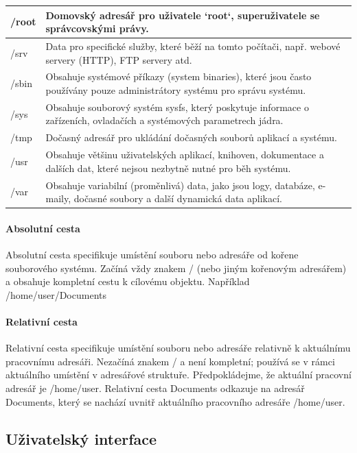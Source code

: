 \begin{center}
\begin{tabular}{|l|p{10cm}|}
 \hline
 /root    & Domovský adresář pro uživatele `root`, superuživatele se správcovskými právy. \\
 \hline
 /srv     & Data pro specifické služby, které běží na tomto počítači, např. webové servery (HTTP), FTP servery atd. \\
 \hline
 /sbin    & Obsahuje systémové příkazy (system binaries), které jsou často používány pouze administrátory systému pro správu systému. \\
 \hline
 /sys     & Obsahuje souborový systém sysfs, který poskytuje informace o zařízeních, ovladačích a systémových parametrech jádra. \\
 \hline
 /tmp     & Dočasný adresář pro ukládání dočasných souborů aplikací a systému. \\
 \hline
 /usr     & Obsahuje většinu uživatelských aplikací, knihoven, dokumentace a dalších dat, které nejsou nezbytně nutné pro běh systému. \\
 \hline
 /var     & Obsahuje variabilní (proměnlivá) data, jako jsou logy, databáze, e-maily, dočasné soubory a další dynamická data aplikací. \\
 \hline
\end{tabular}
\end{center}

\paragraph{Absolutní cesta}
Absolutní cesta specifikuje umístění souboru nebo adresáře od kořene souborového systému. Začíná vždy znakem / (nebo jiným kořenovým adresářem) a obsahuje kompletní cestu k cílovému objektu. Například /home/user/Documents
\paragraph{Relativní cesta}
Relativní cesta specifikuje umístění souboru nebo adresáře relativně k aktuálnímu pracovnímu adresáři. Nezačíná znakem / a není kompletní; používá se v rámci aktuálního umístění v adresářové struktuře.
Předpokládejme, že aktuální pracovní adresář je /home/user. Relativní cesta Documents odkazuje na adresář Documents, který se nachází uvnitř aktuálního pracovního adresáře /home/user.

\subsection{Uživatelský interface} 

